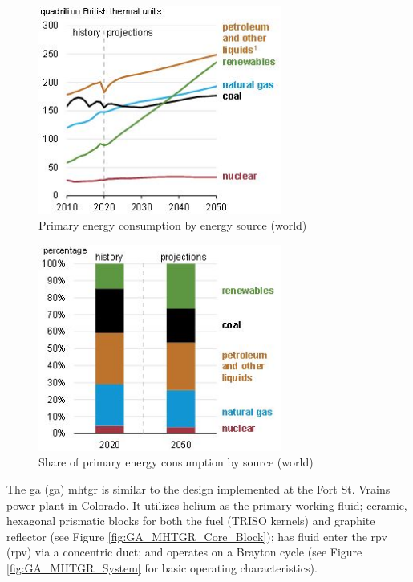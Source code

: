 \documentclass[double,12pt]{beavtex}
\begin{document}
\begin{figure}[!ht]
    \begin{center}
    	\includegraphics[width=8cm]{Figures/EIA_Projections_Sector.JPG}
    	\caption{Primary energy consumption by energy source (world)}
    	\label{fig:EIA_Projections_Sector}
    	\end{center}
\end{figure}

\begin{figure}[!ht]
    \begin{center}
    	\includegraphics[width=8cm]{Figures/EIA_Projections_Source.JPG}
    	\caption{Share of primary energy consumption by source (world)}
    	\label{fig:EIA_Projections_Source}
    	\end{center}
\end{figure}

The \acrlong{ga} (\acrshort{ga}) \acrshort{mhtgr} \cite{murray} is similar to the design implemented at the Fort St. Vrains power plant in Colorado. It utilizes helium as the primary working fluid; ceramic, hexagonal prismatic blocks for both the fuel (TRISO kernels) and graphite reflector (see Figure \ref{fig:GA_MHTGR_Core_Block}); has fluid enter the \acrlong{rpv} (\acrshort{rpv}) via a concentric duct; and operates on a Brayton cycle (see Figure \ref{fig:GA_MHTGR_System} for basic operating characteristics). 
\end{document}
